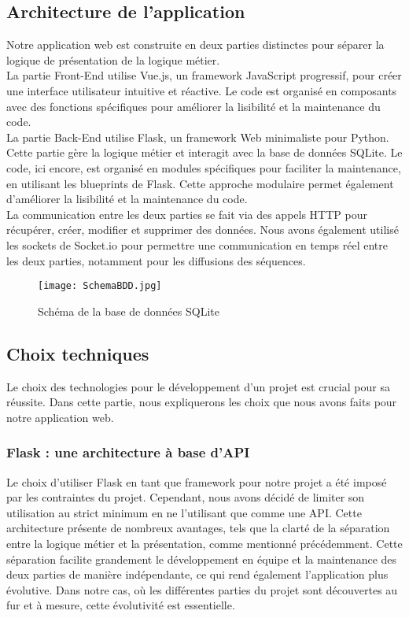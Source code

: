 \subsection{Architecture de l'application}
Notre application web est construite en deux parties distinctes pour séparer la logique de présentation de la logique métier.\\

La partie Front-End utilise Vue.js, un framework JavaScript progressif, pour créer une interface utilisateur intuitive et réactive. Le code est organisé en composants avec des fonctions spécifiques pour améliorer la lisibilité et la maintenance du code.\\

La partie Back-End utilise Flask, un framework Web minimaliste pour Python. Cette partie gère la logique métier et interagit avec la base de données SQLite. Le code, ici encore, est organisé en modules spécifiques pour faciliter la maintenance, en utilisant les blueprints de Flask. Cette approche modulaire permet également d'améliorer la lisibilité et la maintenance du code.\\

La communication entre les deux parties se fait via des appels HTTP pour récupérer, créer, modifier et supprimer des données. Nous avons également utilisé les sockets de Socket.io pour permettre une communication en temps réel entre les deux parties, notamment pour les diffusions des séquences.

\vspace{5mm}
\begin{figure}[H]
\texttt{[image: SchemaBDD.jpg]}
\caption{Schéma de la base de données SQLite}
\end{figure}
\vspace{2mm}

\subsection{Choix techniques}
Le choix des technologies pour le développement d'un projet est crucial pour sa réussite. Dans cette partie, nous expliquerons les choix que nous avons faits pour notre application web.

\vspace{2mm}
\subsubsection{Flask : une architecture à base d'API}
Le choix d'utiliser Flask en tant que framework pour notre projet a été imposé par les contraintes du projet. Cependant, nous avons décidé de limiter son utilisation au strict minimum en ne l'utilisant que comme une API. Cette architecture présente de nombreux avantages, tels que la clarté de la séparation entre la logique métier et la présentation, comme mentionné précédemment. Cette séparation facilite grandement le développement en équipe et la maintenance des deux parties de manière indépendante, ce qui rend également l'application plus évolutive. Dans notre cas, où les différentes parties du projet sont découvertes au fur et à mesure, cette évolutivité est essentielle. 

